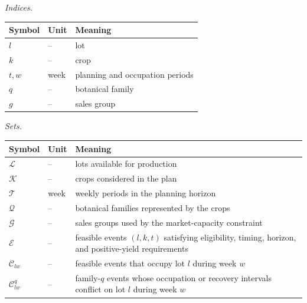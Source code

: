 \documentclass[]{interact}
\newcommand{\Lset}{\mathcal{L}}
\newcommand{\Kset}{\mathcal{K}}
\newcommand{\Tset}{\mathcal{T}}
\newcommand{\Eset}{\mathcal{E}}
\newcommand{\Gset}{\mathcal{G}}
\newcommand{\Qset}{\mathcal{Q}}
\begin{document}
\noindent\textit{Indices.}
\begin{center}
\begin{tabular}{lll}
\toprule
Symbol & Unit & Meaning \\
\midrule
$l$ & -- & lot \\
$k$ & -- & crop \\
$t,w$ & week & planning and occupation periods \\
$q$ & -- & botanical family \\
$g$ & -- & sales group \\
\bottomrule
\end{tabular}
\end{center}

\noindent\textit{Sets.}
\begin{center}
\begin{tabular}{@{}llp{}@{}}
\toprule
Symbol & Unit & Meaning \\
\midrule
$\Lset$ & -- & lots available for production \\
$\Kset$ & -- & crops considered in the plan \\
$\Tset$ & week & weekly periods in the planning horizon \\
$\Qset$ & -- & botanical families represented by the crops \\
$\Gset$ & -- & sales groups used by the market-capacity constraint \\
$\Eset$ & -- & feasible events $(l,k,t)$ satisfying eligibility, timing, horizon, and positive-yield requirements \\
$\mathcal C_{lw}$ & -- & feasible events that occupy lot $l$ during week $w$ \\
$\mathcal C^q_{lw}$ & -- & family-$q$ events whose occupation or recovery intervals conflict on lot $l$ during week $w$ \\
\bottomrule
\end{tabular}
\end{center}
\end{document}
